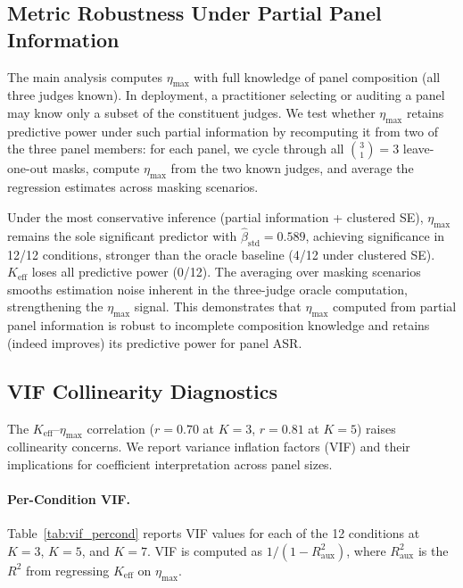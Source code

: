 \subsection{Metric Robustness Under Partial Panel Information}
\label{app:oracle}

The main analysis computes $\eta_{\max}$ with full knowledge of panel composition (all three judges known). In deployment, a practitioner selecting or auditing a panel may know only a subset of the constituent judges. We test whether $\eta_{\max}$ retains predictive power under such partial information by recomputing it from two of the three panel members: for each panel, we cycle through all $\binom{3}{1} = 3$ leave-one-out masks, compute $\eta_{\max}$ from the two known judges, and average the regression estimates across masking scenarios.

Under the most conservative inference (partial information + clustered SE), $\eta_{\max}$ remains the sole significant predictor with $\hat{\beta}_{\mathrm{std}} = 0.589$, achieving significance in 12/12 conditions, stronger than the oracle baseline (4/12 under clustered SE). $K_{\mathrm{eff}}$ loses all predictive power (0/12). The averaging over masking scenarios smooths estimation noise inherent in the three-judge oracle computation, strengthening the $\eta_{\max}$ signal. This demonstrates that $\eta_{\max}$ computed from partial panel information is robust to incomplete composition knowledge and retains (indeed improves) its predictive power for panel ASR.

\subsection{VIF Collinearity Diagnostics}
\label{app:vif_diagnostics}

The $K_{\mathrm{eff}}$--$\eta_{\max}$ correlation ($r{=}0.70$ at $K{=}3$, $r{=}0.81$ at $K{=}5$) raises collinearity concerns. We report variance inflation factors (VIF) and their implications for coefficient interpretation across panel sizes.

\paragraph{Per-Condition VIF.} Table~\ref{tab:vif_percond} reports VIF values for each of the 12 conditions at $K{=}3$, $K{=}5$, and $K{=}7$. VIF is computed as $1/(1 - R^2_{\mathrm{aux}})$, where $R^2_{\mathrm{aux}}$ is the $R^2$ from regressing $K_{\mathrm{eff}}$ on $\eta_{\max}$.

